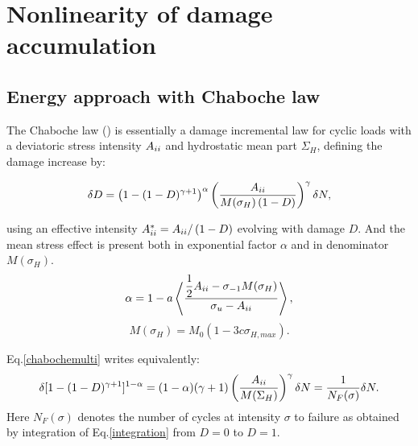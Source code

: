 \section{Nonlinearity of damage accumulation}
\label{sec:5.6}
\subsection{Energy approach with Chaboche law}
The Chaboche law (\cite{lemaitre1990mechanics}) is essentially a damage incremental law for cyclic loads with a deviatoric stress intensity ${A}_{\uppercase\expandafter{\romannumeral2}}$ and hydrostatic mean part $\Sigma_H$, defining the damage increase by:

\begin{equation}\delta D = \left( 1 -(1-D)^{\gamma+1}\right)^\alpha \left(\frac{{A}_{\uppercase\expandafter{\romannumeral2}} }{M(\sigma_H)\left( 1-D\right)}\right)^\gamma \delta N ,
\label{chabochemulti}
\end{equation} 

using an effective intensity ${A}_{\uppercase\expandafter{\romannumeral2}}^*={A}_{\uppercase\expandafter{\romannumeral2}}/\left( 1-D\right) $ evolving with damage $D$. And the mean stress effect is present both in exponential factor $\alpha$ and in denominator $M(\sigma_H)$.
$$\alpha=1 - a\left\langle \dfrac{\dfrac{1}{2}{A}_{\uppercase\expandafter{\romannumeral2}}-\sigma_{-1}M(\sigma_H) }{\sigma_{u} -{A}_{\uppercase\expandafter{\romannumeral2}}}\right\rangle,$$
$$M(\sigma_H) =M_0 \left(1-3c\sigma_{H,max}\right).$$

Eq.\eqref{chabochemulti} writes equivalently:
\begin{equation}\delta [1-(1-D)^{\gamma+1}]^{1-\alpha}=(1-\alpha)(\gamma+1)\left(\dfrac{{A}_{\uppercase\expandafter{\romannumeral2}} }{M(\Sigma_H)}\right)^\gamma \delta N=\dfrac{1}{N_F(\sigma)}\delta N.
\label{integration}
\end{equation}
Here $N_F(\sigma)$ denotes the number of cycles at intensity $\sigma$ to failure as obtained by integration of Eq.\eqref{integration} from $D=0$ to $D=1$. 

%
%


